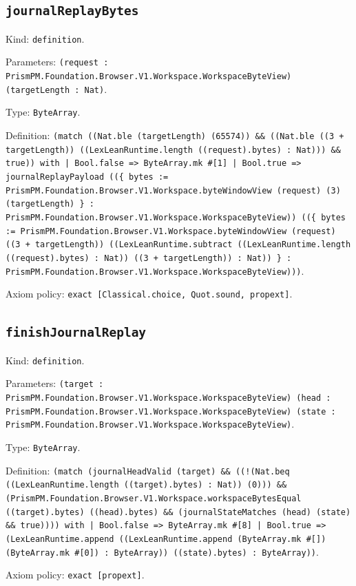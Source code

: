 \documentclass[11pt]{article}
\begin{document}
\subsection*{\texttt{journalReplayBytes}}
\noindent Kind: \texttt{definition}.\par
\noindent Parameters: \texttt{(request : PrismPM.Foundation.Browser.V1.Workspace.WorkspaceByteView) (targetLength : Nat)}.\par
\noindent Type: \texttt{ByteArray}.\par
\noindent Definition: \texttt{(match ((Nat.ble (targetLength) (65574)) \&\& ((Nat.ble ((3 + targetLength)) ((LexLeanRuntime.length ((request).bytes) : Nat))) \&\& true)) with | Bool.false => ByteArray.mk \#[1] | Bool.true => journalReplayPayload ((\{ bytes := PrismPM.Foundation.Browser.V1.Workspace.byteWindowView (request) (3) (targetLength) \} : PrismPM.Foundation.Browser.V1.Workspace.WorkspaceByteView)) ((\{ bytes := PrismPM.Foundation.Browser.V1.Workspace.byteWindowView (request) ((3 + targetLength)) ((LexLeanRuntime.subtract ((LexLeanRuntime.length ((request).bytes) : Nat)) ((3 + targetLength)) : Nat)) \} : PrismPM.Foundation.Browser.V1.Workspace.WorkspaceByteView)))}.\par
\noindent Axiom policy: \texttt{exact [Classical.choice, Quot.sound, propext]}.\par
\subsection*{\texttt{finishJournalReplay}}
\noindent Kind: \texttt{definition}.\par
\noindent Parameters: \texttt{(target : PrismPM.Foundation.Browser.V1.Workspace.WorkspaceByteView) (head : PrismPM.Foundation.Browser.V1.Workspace.WorkspaceByteView) (state : PrismPM.Foundation.Browser.V1.Workspace.WorkspaceByteView)}.\par
\noindent Type: \texttt{ByteArray}.\par
\noindent Definition: \texttt{(match (journalHeadValid (target) \&\& ((!(Nat.beq ((LexLeanRuntime.length ((target).bytes) : Nat)) (0))) \&\& (PrismPM.Foundation.Browser.V1.Workspace.workspaceBytesEqual ((target).bytes) ((head).bytes) \&\& (journalStateMatches (head) (state) \&\& true)))) with | Bool.false => ByteArray.mk \#[8] | Bool.true => (LexLeanRuntime.append ((LexLeanRuntime.append (ByteArray.mk \#[]) (ByteArray.mk \#[0]) : ByteArray)) ((state).bytes) : ByteArray))}.\par
\noindent Axiom policy: \texttt{exact [propext]}.\par
\end{document}

